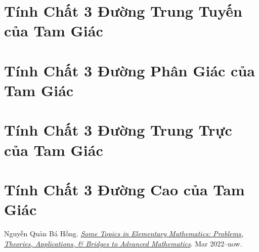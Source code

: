 \documentclass[oneside]{book}
\numberwithin{equation}{section}
\begin{document}
\section{Tính Chất 3 Đường Trung Tuyến của Tam Giác}

\section{Tính Chất 3 Đường Phân Giác của Tam Giác}

\section{Tính Chất 3 Đường Trung Trực của Tam Giác}

\section{Tính Chất 3 Đường Cao của Tam Giác}


\begin{thebibliography}{99}
	 Nguyễn Quản Bá Hồng. \href{https://github.com/NQBH/hobby/blob/master/elementary_mathematics/some_topics_in_elementary_mathematics_problems_theories_applications_bridges_to_advanced_mathematics/NQBH_some_topics_in_elementary_mathematics_problems_theories_applications_bridges_to_advanced_mathematics.pdf}{\textit{Some Topics in Elementary Mathematics: Problems, Theories, Applications, \& Bridges to Advanced Mathematics}}. Mar 2022--now.
\end{thebibliography}


\printbibliography[heading=bibintoc]
	
\end{document}
